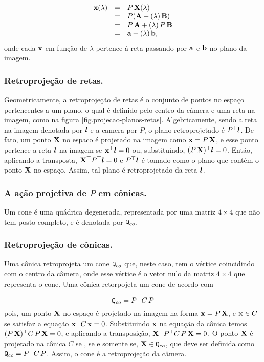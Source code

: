 \begin{equation*}
\begin{array}{rcl}
\mathbf{x}(\lambda)&=&P\,\mathbf{X}(\lambda)\\
&=&P({\bf A}+(\lambda)\,{\bf B})\\
&=&P\,{\bf A}+(\lambda)\,P\,{\bf B}\\
&=&{\bf a}+(\lambda)\,{\bf b},
\end{array}
\end{equation*}
onde cada $\mathbf{x}$ em função de $\lambda$ pertence à reta passando por ${\bf a}$ e ${\bf b}$ no plano da imagem.  

\subsubsection*{Retroprojeção de retas.}
Geometricamente, a retroprojeção de retas é o conjunto de pontos no espaço pertencentes a um plano, o qual é definido pelo centro da câmera e uma reta na imagem, como na figura \ref{fig.projecao-planos-retas}. Algebricamente, sendo a reta na imagem denotada por $\boldsymbol{l}$ e a camera por $P$, o plano retroprojetado é $P^\top\boldsymbol{l}$. De fato, um ponto $\mathbf{X}$ no espaco é projetado na imagem como $\mathbf{x}=P\,\mathbf{X}$, e esse ponto pertence a reta $\boldsymbol{l}$ na imagem se $\mathbf{x}^\top\boldsymbol{l}=0$ ou, substituindo, $(P\,\mathbf{X})^\top\boldsymbol{l}=0$. Então, aplicando a transposta, $\mathbf{X}^\top P^\top\boldsymbol{l}=0$ e $P^\top\boldsymbol{l}$ é tomado como o plano que contém o ponto $\mathbf{X}$ no espaço. Assim, tal plano é retroprojetado da reta $\boldsymbol{l}$.  

\subsubsection{A ação projetiva de $P$ em cônicas.}
Um cone é uma quádrica degenerada, representada por uma matriz $4\times4$ que não tem posto completo, e é denotada por ${\tt Q}_{co}$.

\subsubsection*{Retroprojeção de cônicas.}
Uma cônica retroprojeta um cone ${\tt Q}_{co}$ que, neste caso, tem o vértice coincidindo com o centro da câmera, onde esse vértice é o vetor nulo da matriz $4\times4$ que representa o cone. Uma cônica retorpojeta um cone de acordo com 

\begin{equation*}
{\tt Q}_{co}=P^\top C\,P
\end{equation*}
pois, um ponto $\mathbf{X}$ no espaço é projetado na imagem na forma $\mathbf{x}=P\,\mathbf{X}$, e $\mathbf{x}\in C$ se satisfaz a equação $\mathbf{x}^\top C\,\mathbf{x}=0$. Substituindo $\mathbf{x}$ na equação da cônica temos $(P\,\mathbf{X})^\top C\,P\,\mathbf{X}=0$, e aplicando a transposição, $\mathbf{X}^\top P^\top C\,P\,\mathbf{X}=0$. O ponto $\mathbf{X}$ é projetado na cônica $C$ se , se e somente se, $\mathbf{X}\in {\tt Q}_{co}$, que deve ser definida como ${\tt Q}_{co}=P^\top C\,P$. Assim, o cone é a retroprojeção da câmera. 

